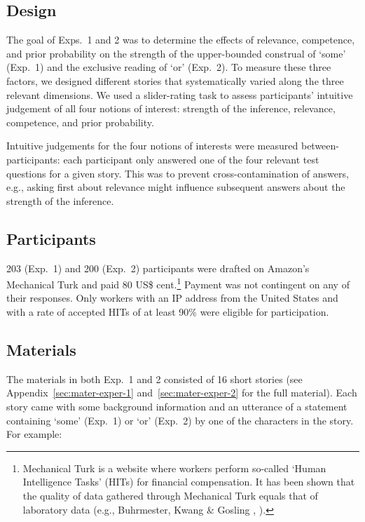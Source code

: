 \documentclass[12pt]{article}
\begin{document}
\subsection*{Design}

The goal of Exps.\ 1 and 2 was to determine the effects of relevance, competence, and prior probability on the strength of the upper-bounded construal of `some' (Exp.\ 1) and the exclusive reading of `or' (Exp.\ 2). To measure these three factors, we designed different stories that systematically varied along the three relevant dimensions. We used a slider-rating task to assess participants' intuitive judgement of all four notions of interest: strength of the inference, relevance, competence, and prior probability.

Intuitive judgements for the four notions of interests were measured between-participants: each participant only answered one of the four relevant test questions for a given story. This was to prevent cross-contamination of answers, e.g., asking first about relevance might influence subsequent answers about the strength of the inference.

\subsection*{Participants}

203 (Exp.\ 1) and 200 (Exp.\ 2) participants were drafted on Amazon's Mechanical Turk and paid 80 US\$ cent.\footnote{Mechanical Turk is a website where workers perform so-called `Human Intelligence Tasks' (HITs) for financial compensation. It has been shown that the quality of data gathered through Mechanical Turk equals that of laboratory data (e.g., Buhrmester, Kwang \& Gosling \citeyear{buhrmester2011}, \citealt{schnoebelen2010, sprouse2011}).} Payment was not contingent on any of their responses. Only workers with an IP address from the United States and with a rate of accepted HITs of at least 90\% were eligible for participation.

\subsection*{Materials}

The materials in both Exp.\ 1 and 2 consisted of 16 short stories (see
Appendix~\ref{sec:mater-exper-1} and~\ref{sec:mater-exper-2} for the full material). Each story
came with some background information and an utterance of a statement containing `some' (Exp.\
1) or `or' (Exp.\ 2) by one of the characters in the story. For example:
\end{document}
